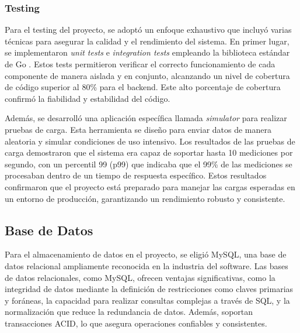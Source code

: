 {\subsubsection{Testing}
Para el testing del proyecto, se adoptó un enfoque exhaustivo que incluyó varias técnicas para asegurar la calidad y el rendimiento del sistema. En primer lugar, se implementaron \textit{unit tests} e \textit{integration tests} empleando la biblioteca estándar de Go \cite{GoStdlibTesting}. Estos tests permitieron verificar el correcto funcionamiento de cada componente de manera aislada y en conjunto, alcanzando un nivel de cobertura de código superior al 80\% para el backend. Este alto porcentaje de cobertura confirmó la fiabilidad y estabilidad del código.

Además, se desarrolló una aplicación específica llamada \textit{simulator} para realizar pruebas de carga. Esta herramienta se diseño para enviar datos de manera aleatoria y simular condiciones de uso intensivo. Los resultados de las pruebas de carga demostraron que el sistema era capaz de soportar hasta 10 mediciones por segundo, con un percentil 99 (p99) que indicaba que el 99\% de las mediciones se procesaban dentro de un tiempo de respuesta específico. Estos resultados confirmaron que el proyecto está preparado para manejar las cargas esperadas en un entorno de producción, garantizando un rendimiento robusto y consistente.




\subsection{Base de Datos}

Para el almacenamiento de datos en el proyecto, se eligió MySQL, una base de datos relacional ampliamente reconocida en la industria del software. Las bases de datos relacionales, como MySQL, ofrecen ventajas significativas, como la integridad de datos mediante la definición de restricciones como claves primarias y foráneas, la capacidad para realizar consultas complejas a través de SQL, y la normalización que reduce la redundancia de datos. Además, soportan transacciones ACID, lo que asegura operaciones confiables y consistentes.

}
